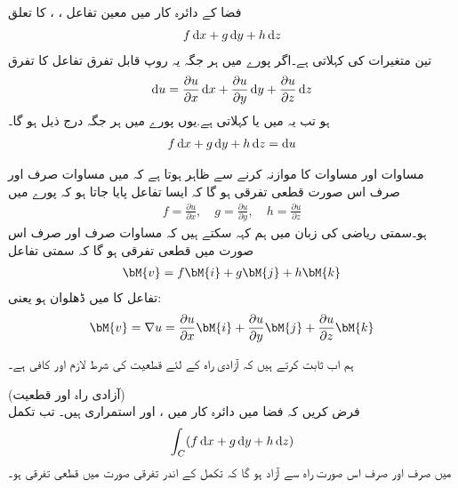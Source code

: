 فضا کے دائرہ کار  میں معین تفاعل ، ،  کا تعلق
\begin{align}\label{مساوات_خطی_تکمل_آزاد_راہ_ب}
f\dif x+g\dif y+h\dif z
\end{align}
 تین متغیرات کی  کہلاتی ہے۔اگر پورے  میں ہر جگہ  یہ روپ قابل تفرق تفاعل  کا تفرق
\begin{align}\label{مساوات_خطی_تکمل_آزاد_راہ_پ}
\dif u=\frac{\partial u}{\partial x}\dif x+\frac{\partial u}{\partial y}\dif y+\frac{\partial u}{\partial z}\dif z
\end{align}
ہو  تب یہ  میں  یا  کہلاتی ہے.یوں پورے  میں ہر جگہ درج ذیل ہو گا۔
\begin{align}\label{مساوات_خطی_تکمل_آزاد_راہ_ت}
f\dif x+g\dif y+h\dif z=\dif u
\end{align}

مساوات  اور مساوات  کا موازنہ کرنے سے ظاہر ہوتا ہے کہ  میں مساوات  صرف اور صرف اس صورت قطعی تفرقی ہو گا کہ ایسا تفاعل  پایا جاتا ہو کہ پورے  میں
\begin{align}\label{مساوات_خطی_تکمل_آزاد_راہ_ٹ}
f=\frac{\partial u}{\partial x},\quad g=\frac{\partial u}{\partial y},\quad h=\frac{\partial u}{\partial z}
\end{align}
ہو۔سمتی ریاضی کی زبان میں ہم کہہ سکتے ہیں کہ مساوات  صرف اور صرف اس صورت  میں قطعی تفرقی ہو گا کہ سمتی تفاعل
\begin{align*}
\bM{v}=f\bM{i}+g\bM{j}+h\bM{k}
\end{align*}
تفاعل  کا  میں ڈھلوان ہو یعنی:
\begin{align}\label{مساوات_خطی_تکمل_آزاد_راہ_ث}
\bM{v}=\nabla u=\frac{\partial u}{\partial x}\bM{i}+\frac{\partial u}{\partial y}\bM{j}+\frac{\partial u}{\partial z}\bM{k}
\end{align}

ہم اب ثابت کرتے ہیں کہ آزادی راہ کے لئے  قطعیت کی شرط لازم اور کافی ہے۔

\quad (آزادی راہ اور قطعیت)\\
فرض کریں کہ فضا میں دائرہ کار  میں ،  اور   استمراری ہیں۔ تب تکمل
\begin{align}\label{مساوات_خطی_تکمل_قطعیت_آزادی_راہ_الف}
\int_C (f\dif x+g\dif y+h\dif z)
\end{align}
 میں  صرف اور صرف اس صورت راہ سے آزاد ہو گا کہ تکمل کے اندر تفرقی صورت  میں قطعی تفرقی ہو۔


